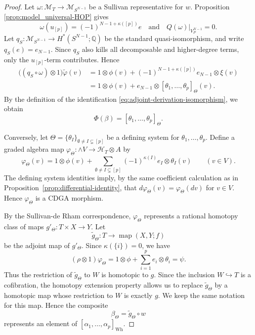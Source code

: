 \documentclass[a4paper,10pt]{amsart}
\theoremstyle{definition}
\theoremstyle{remark}
\newcommand{\map}{\operatorname{map}}
\numberwithin{equation}{section}
\begin{document}
\begin{proof}
Let
$
\omega:\mathcal M_T\to\mathcal M_{S^{N-1}}
$
be a Sullivan representative for $w$.
Proposition \ref{prop:model_universal-HOP}
gives
\[
        \omega(u_{[p]})
        =
        (-1)^{N-1+\kappa([p])}e
        \quad
        \text{and}
        \quad
        Q(\omega)|_{V_P^{N-1}}=0.
\]
Let
$
q_S:\mathcal M_{S^{N-1}}
\to H^*(S^{N-1};\mathbb Q)
$
be the standard quasi-isomorphism, and write $q_S(e)=e_{N-1}$.
Since $q_S$ also kills all decomposable and higher-degree terms, only the
$u_{[p]}$-term contributes.
Hence
\[
\begin{aligned}
\bigl((q_S\circ\omega)\otimes1\bigr)\widetilde\varphi(v)
&=
1\otimes\phi(v)
+
(-1)^{N-1+\kappa([p])}
e_{N-1}\otimes\xi(v)
\\
&=
1\otimes\phi(v)
+
e_{N-1}\otimes
[\theta_1,\ldots,\theta_p]_\Theta(v).
\end{aligned}
\]
By the definition of the identification
\eqref{eq:adjoint-derivation-isomorphism}, we obtain
\[
        \Phi(\beta)
=
[\theta_1,\ldots,\theta_p]_\Theta.
\]

Conversely, let
$
\Theta=\{\theta_I\}_{\emptyset\neq I\subsetneq[p]}
$
be a defining system for $\theta_1,\ldots,\theta_p$. 
Define a graded algebra
map
$
\varphi_\Theta:\wedge V\to\mathcal H_T\otimes A
$
by
\[
\varphi_\Theta(v)
=
1\otimes\phi(v)
+
\sum_{\emptyset\neq I\subsetneq[p]}
(-1)^{\kappa(I)}e_I\otimes\theta_I(v)
\qquad (v\in V).
\]
The defining system identities imply, by the same coefficient calculation as
in Proposition~\ref{prop:differential-identity}, that
$
        d\varphi_\Theta(v)=\varphi_\Theta(dv)
$
for $v\in V$. Hence $\varphi_\Theta$ is a CDGA morphism.

By the Sullivan-de Rham correspondence, $\varphi_\Theta$ represents a rational
homotopy class of maps
$
g'_\Theta:T\times X\to Y.
$
Let
\[
\widetilde g_\Theta:T\longrightarrow \map(X,Y;f)
\]
be the adjoint map of $g'_\Theta$. Since $\kappa(\{i\})=0$, we have
\[
(\rho\otimes 1)\varphi_\Theta
=
1\otimes\phi
+
\sum_{i=1}^p e_i\otimes\theta_i
=
\psi.
\]
Thus the restriction of $\widetilde g_\Theta$ to $W$ is homotopic to $g$.
Since the inclusion $W\hookrightarrow T$ is a cofibration, the homotopy
extension property allows us to replace $\widetilde g_\Theta$ by a homotopic
map whose restriction to $W$ is exactly $g$. We keep the same notation for
this map.
Hence the composite
\[
        \beta_\Theta=\widetilde g_\Theta\circ w
\]
represents an element of
$[\alpha_1,\ldots,\alpha_p]_{\mathrm{Wh}}$.


\end{proof}
\end{document}

